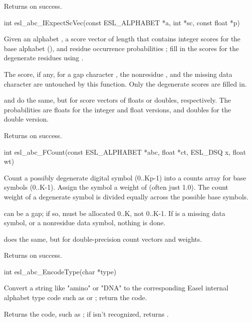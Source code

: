 \begin{sreapi}
Returns  on success.


\hypertarget{func:esl_abc_IExpectScVec()}
{\item[int esl\_abc\_IExpectScVec(const ESL\_ALPHABET *a, int *sc, const float *p)]}

Given an alphabet , a score vector  of length
 that contains integer scores for the base
alphabet (), and residue occurrence probabilities
; fill in the scores for the
degenerate residues  using .

The score, if any, for a gap character , the
nonresidue , and the missing data character 
are untouched by this function. Only the degenerate
scores  are filled in.

 and  do
the same, but for score vectors of floats or doubles,
respectively. The probabilities  are floats for the
integer and float versions, and doubles for the double
version.

Returns  on success.


\hypertarget{func:esl_abc_FCount()}
{\item[int esl\_abc\_FCount(const ESL\_ALPHABET *abc, float *ct, ESL\_DSQ x, float wt)]}

Count a possibly degenerate digital symbol  (0..Kp-1)
into a counts array  for base symbols (0..K-1).
Assign the symbol a weight of  (often just 1.0).
The count weight of a degenerate symbol is divided equally
across the possible base symbols. 

 can be a gap; if so,  must be allocated 0..K,
not 0..K-1. If  is a missing data symbol, or a nonresidue
data symbol, nothing is done.

 does the same, but for double-precision
count vectors and weights.

Returns  on success.


\hypertarget{func:esl_abc_EncodeType()}
{\item[int esl\_abc\_EncodeType(char *type)]}

Convert a string like "amino" or "DNA" to the
corresponding Easel internal alphabet type code
such as  or ; return the code.

Returns the code, such as ; if  isn't
recognized, returns .



\end{sreapi}
